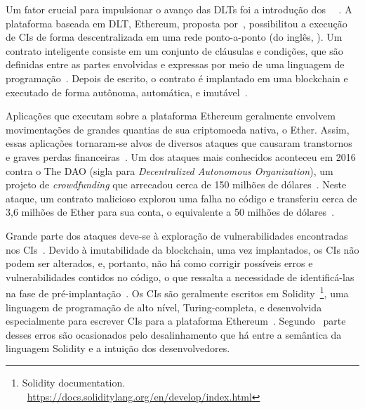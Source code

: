 Um fator crucial para impulsionar o avanço das DLTs foi a introdução dos ~~\cite{maesa2020blockchain3.0}. A plataforma baseada em DLT, Ethereum, proposta por~, possibilitou a execução de CIs de forma descentralizada em uma rede ponto-a-ponto (do inglês, ). Um contrato inteligente consiste em um conjunto de cláusulas e condições, que são definidas entre as partes envolvidas e expressas por meio de uma linguagem de programação~\cite{overview-smartcontracts2020zheng}. Depois de escrito, o contrato é implantado em uma blockchain e executado de forma autônoma, automática, e imutável~\cite{overview-smartcontracts2020zheng, kannengiesser2020trade-offs-acmcs}. 


Aplicações que executam sobre a plataforma Ethereum geralmente envolvem movimentações de grandes quantias de sua criptomoeda nativa, o Ether. Assim, essas aplicações tornaram-se alvos de diversos ataques que causaram transtornos e graves perdas financeiras~\cite{atzei2017survey-attacks-sok, chen2020survey-ethereum-acm}. Um dos ataques mais conhecidos aconteceu em 2016 contra o The DAO (sigla para \textit{Decentralized
Autonomous Organization}), um projeto de \textit{crowdfunding} que arrecadou cerca de 150 milhões de dólares~\cite{chen2020survey-ethereum-acm}. Neste ataque, um contrato malicioso explorou uma falha no código e transferiu cerca de 3,6 milhões de Ether para sua conta, o equivalente a 50 milhões de dólares~\cite{chen2020survey-ethereum-acm, siegel-dao-attack, atzei2017survey-attacks-sok}. 

Grande parte dos ataques deve-se à exploração de vulnerabilidades encontradas nos CIs~\cite{chen2020survey-ethereum-acm, atzei2017survey-attacks-sok, liu2019survey-ieeeaccess}. Devido à imutabilidade da blockchain, uma vez implantados, os CIs não podem ser alterados, e, portanto, não há como corrigir possíveis erros e vulnerabilidades contidos no código, o que ressalta a necessidade de identificá-las na fase de pré-implantação~\cite{vacca2020systematic, dika2018security}. Os CIs são geralmente escritos em Solidity~\footnote{Solidity documentation. ~\url{https://docs.soliditylang.org/en/develop/index.html}}, uma linguagem de programação de alto nível, Turing-completa, e desenvolvida especialmente para escrever CIs para a plataforma Ethereum~\cite{varela2021smart-languages-acmcs}.    Segundo~ parte desses erros são ocasionados pelo desalinhamento que há entre a semântica da linguagem Solidity e a intuição dos desenvolvedores. 

